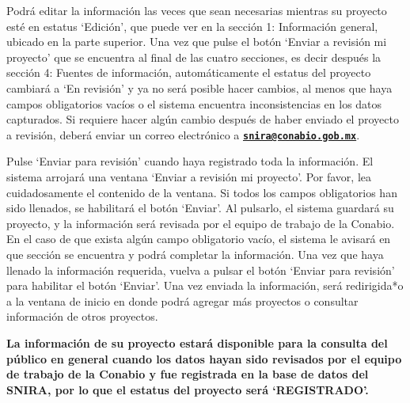 \documentclass[
]{book}
\begin{document}
Podrá editar la información las veces que sean necesarias mientras su proyecto esté en estatus `Edición', que puede ver en la sección 1: Información general, ubicado en la parte superior. Una vez que pulse el botón `Enviar a revisión mi proyecto' que se encuentra al final de las cuatro secciones, es decir después la sección 4: Fuentes de información, automáticamente el estatus del proyecto cambiará a `En revisión' y ya no será posible hacer cambios, al menos que haya campos obligatorios vacíos o el sistema encuentra inconsistencias en los datos capturados. Si requiere hacer algún cambio después de haber enviado el proyecto a revisión, deberá enviar un correo electrónico a \textbf{\href{mailto:snira@conabio.gob.mx}{\nolinkurl{snira@conabio.gob.mx}}}.

Pulse `Enviar para revisión' cuando haya registrado toda la información.
El sistema arrojará una ventana `Enviar a revisión mi proyecto'. Por favor, lea cuidadosamente el contenido de la ventana.
Si todos los campos obligatorios han sido llenados, se habilitará el botón `Enviar'. Al pulsarlo, el sistema guardará su proyecto, y la información será revisada por el equipo de trabajo de la Conabio.
En el caso de que exista algún campo obligatorio vacío, el sistema le avisará en que sección se encuentra y podrá completar la información. Una vez que haya llenado la información requerida, vuelva a pulsar el botón `Enviar para revisión' para habilitar el botón `Enviar'.
Una vez enviada la información, será redirigida*o a la ventana de inicio en donde podrá agregar más proyectos o consultar información de otros proyectos.

\textbf{La información de su proyecto estará disponible para la consulta del público en general cuando los datos hayan sido revisados por el equipo de trabajo de la Conabio y fue registrada en la base de datos del SNIRA, por lo que el estatus del proyecto será `REGISTRADO'.}

  
\end{document}
